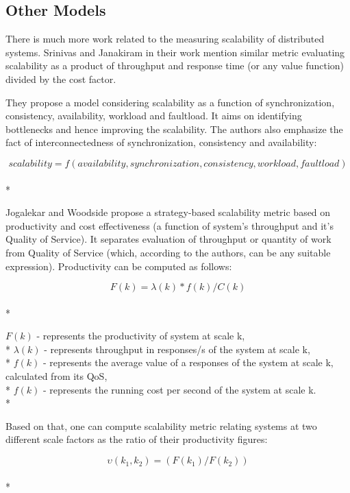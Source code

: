 \documentclass{uvamscse}
\begin{document}
\subsection{Other Models}
There is much more work related to the measuring scalability of distributed systems. Srinivas and Janakiram in their work \cite{SriJan} mention similar metric evaluating scalability as a product of throughput and response time (or any value function) divided by the cost factor.

They propose a model considering scalability as a function of synchronization, consistency, availability, workload and faultload. It aims on identifying bottlenecks and hence improving the scalability. The authors also emphasize the fact of interconnectedness of synchronization, consistency and availability:
\begin{center}
  $$scalability = f(availability, synchronization, consistency ,workload, faultload)$$ \\*
\end{center}

Jogalekar and Woodside \cite{EvaScaDS} propose a strategy-based scalability metric based on productivity and cost effectiveness (a function of system's throughput and it’s Quality of Service). It separates evaluation of throughput or quantity of work from Quality of Service (which, according to the authors, can be any suitable expression). Productivity can be computed as follows:
\begin{center}
  $$F(k) = \lambda(k) * f(k) / C(k)$$ \\*
\end{center}
  \texttt{$F(k)$} - represents the productivity of system at scale k, \\*
  \texttt{$\lambda(k)$} - represents throughput in responses/s of the system at scale k, \\*
  \texttt{$f(k)$} - represents the average value of a responses of the system at scale k, calculated from its QoS, \\*
  \texttt{$f(k)$} - represents the running cost per second of the system at scale k. \\*

Based on that, one can compute scalability metric relating systems at two different scale factors as the ratio of their productivity figures:
\begin{center}
  $$\upsilon(k_1,k_2) = (F(k_1)/F(k_2)) $$\\*
\end{center}
\end{document}
